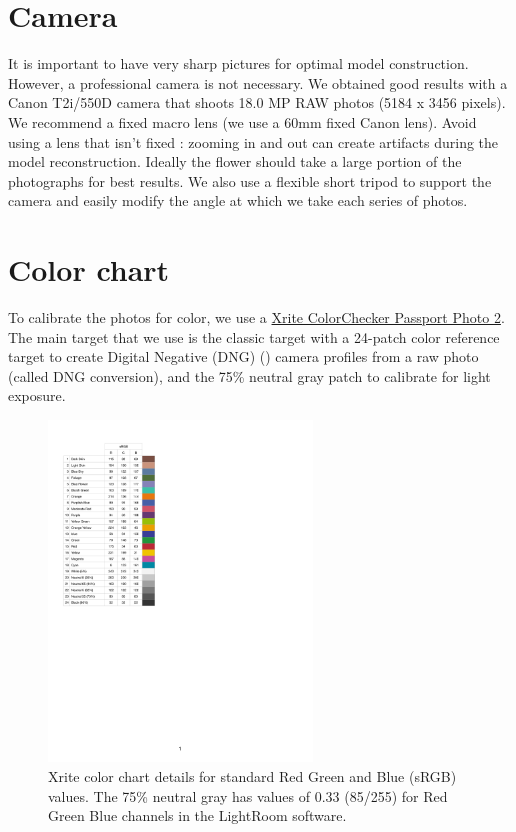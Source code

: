 \documentclass[
]{book}
\theoremstyle{definition}
\theoremstyle{definition}
\theoremstyle{definition}
\theoremstyle{definition}
\theoremstyle{remark}
\begin{document}
\hypertarget{camera}{%
\section{Camera}\label{camera}}

It is important to have very sharp pictures for optimal model
construction. However, a professional camera is not necessary. We
obtained good results with a Canon T2i/550D camera that shoots 18.0 MP
RAW photos (5184 x 3456 pixels). We recommend a fixed macro lens (we use
a 60mm fixed Canon lens). Avoid using a lens that isn't fixed : zooming
in and out can create artifacts during the model reconstruction. Ideally
the flower should take a large portion of the photographs for best
results. We also use a flexible short tripod to support the camera and
easily modify the angle at which we take each series of photos.

\hypertarget{color-chart}{%
\section{Color chart}\label{color-chart}}

To calibrate the photos for color, we use a \href{https://www.xrite.com/categories/calibration-profiling/colorchecker-classic-family/colorchecker-passport-photo-2}{Xrite ColorChecker Passport
Photo
2}.
The main target that we use is the classic target with a 24-patch color
reference target to create Digital Negative (DNG) (\citet{Adobe2012DNG}) camera
profiles from a raw photo (called DNG conversion), and the 75\% neutral
gray patch to calibrate for light exposure.

\begin{figure}
\hypertarget{fig:xrite_description}{%
\centering
\includegraphics[width=7cm,height=\textheight]{Figures/Color chart sRGB values.pdf}
\caption{Xrite color chart details for standard Red Green and Blue (sRGB)
values. The 75\% neutral gray has values of 0.33 (85/255) for Red Green
Blue channels in the LightRoom
software.}\label{fig:xrite_description}
}
\end{figure}
\end{document}
